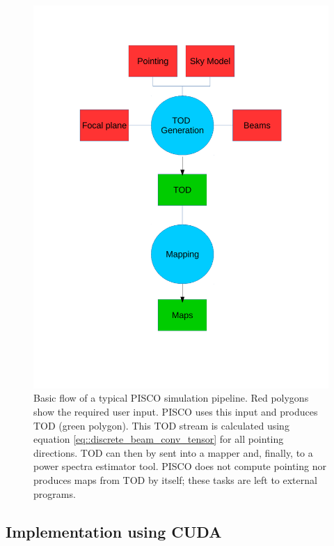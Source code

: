 \documentclass[a4paper,11pt]{article}
\begin{document}
\begin{figure}
	\centering
	\includegraphics[width=0.6\linewidth]{figures/pisco-flow-diagram}
	\caption{Basic flow of a typical PISCO simulation pipeline. Red polygons show the required user input. PISCO uses this input and produces TOD (green polygon). This TOD stream is calculated using equation \ref{eq::discrete_beam_conv_tensor} for all pointing directions. TOD can then by sent into a mapper and, finally, to a power spectra estimator tool. PISCO does not compute pointing nor produces maps from TOD by itself; these tasks are left to external programs.}
	\label{fig::pisco_flow}
\end{figure}

\subsection{Implementation using CUDA}
\end{document}
